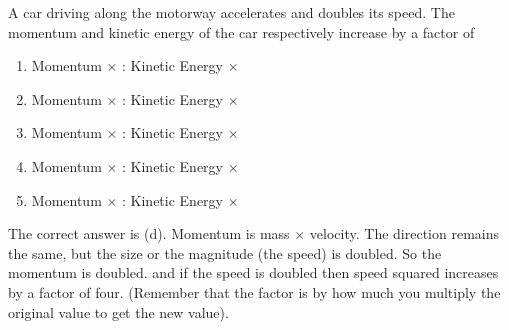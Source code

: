 
\begin{problem}[Robin1]
{A car driving along the motorway accelerates and doubles its speed. The momentum and kinetic energy of the car respectively increase by a factor of
\begin{enumerate}
	\item Momentum $\times$  \quad : \quad Kinetic Energy $\times$ 	
	\item Momentum $\times$  \quad : \quad Kinetic Energy $\times$  
	\item Momentum $\times$  \quad : \quad Kinetic Energy $\times$ 
	\item Momentum $\times$  \quad : \quad Kinetic Energy $\times$ \answer
	\item Momentum $\times$  \quad : \quad Kinetic Energy $\times$ 
\end{enumerate}
}
{}
{The correct answer is (d).  Momentum is mass $\times$ velocity. The direction remains the same, but the size or the magnitude (the speed) is doubled. So the momentum is doubled.  and if the speed is doubled then speed squared increases by a factor of four. (Remember that the factor is by how much you multiply the original value to get the new value).}
\end{problem}